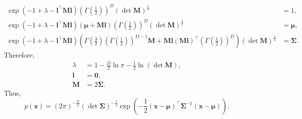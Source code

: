 \begin{equation}
\begin{aligned}
\exp 
\left( 
	- 
	1 
	+ 
	\lambda
	- 
	\mathbf{l} ^ \intercal 
	\mathbf{M} 
	\mathbf{l} 
\right) 
\left( 
	\Gamma 
	\left( 
		\frac{1}{2} 
	\right) 
\right) ^ D 
(\det \mathbf{M}) ^ \frac{1}{2}
&= 
1, 
\\
\exp 
\left( 
	- 
	1 
	+ 
	\lambda
	- 
	\mathbf{l} ^ \intercal 
	\mathbf{M} 
	\mathbf{l} 
\right)
(\bm{\mu} + \mathbf{M} \mathbf{l}) 
\left( 
	\Gamma 
	\left( 
		\frac{1}{2} 
	\right) 
\right) ^ D 
(\det \mathbf{M}) ^ \frac{1}{2}
&= 
\bm{\mu}, 
\\
\exp 
\left( 
	- 
	1 
	+ 
	\lambda
	- 
	\mathbf{l} ^ \intercal 
	\mathbf{M} 
	\mathbf{l} 
\right)
\left( 
	\Gamma 
	\left( 
		\frac{3}{2} 
	\right) 
	\left( 
		\Gamma 
		\left( 
			\frac{1}{2} 
		\right) 
	\right) ^ {D - 1} 
	\mathbf{M} 
	+ 	
	\mathbf{M} 
	\mathbf{l} 
	(\mathbf{M} \mathbf{l}) ^ \intercal 
	\left( 
		\Gamma 
		\left( 
			\frac{1}{2} 
		\right) 
	\right) ^ D 
\right) 
(\det \mathbf{M}) ^ \frac{1}{2}
&= 
\bm{\Sigma}. 
\end{aligned}
\end{equation}
%
Therefore,
%
\begin{equation}
\begin{aligned}
\lambda 
&= 
1 
- 
\frac{D}{2} 
\ln \pi 
- 
\frac{1}{2} 
\ln (\det \mathbf{M}), 
\\
\mathbf{l} 
&= 
\mathbf{0}, 
\\
\mathbf{M} 
&= 
2 
\bm{\Sigma}.
\end{aligned}
\end{equation}
%
Thus,
%
\begin{equation}
p(\mathbf{x}) 
= 
(2 \pi) ^ {- \frac{D}{2}} 
(\det \bm{\Sigma}) ^ {- \frac{1}{2}} 
\exp 
\left( 
	- 
	\frac{1}{2}
	(\mathbf{x} - \bm{\mu}) ^ \intercal 
	\bm{\Sigma} ^ {- 1} 
	(\mathbf{x} - \bm{\mu}) 
\right).
\end{equation}
%


